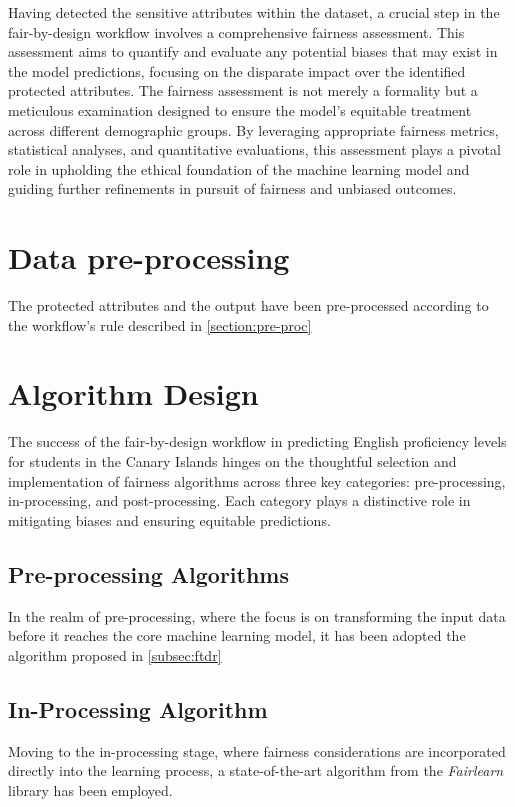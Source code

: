 \documentclass[12pt,a4paper,openright,twoside]{book}
\begin{document}
Having detected the sensitive attributes within the dataset, a crucial step in the fair-by-design workflow involves a comprehensive fairness assessment. This assessment aims to quantify and evaluate any potential biases that may exist in the model predictions, focusing on the disparate impact over the identified protected attributes. The fairness assessment is not merely a formality but a meticulous examination designed to ensure the model's equitable treatment across different demographic groups. By leveraging appropriate fairness metrics, statistical analyses, and quantitative evaluations, this assessment plays a pivotal role in upholding the ethical foundation of the machine learning model and guiding further refinements in pursuit of fairness and unbiased outcomes.

\section{Data pre-processing}

The protected attributes and the output have been pre-processed according to the workflow's rule described in \cref{section:pre-proc}

\section{Algorithm Design}

The success of the fair-by-design workflow in predicting English proficiency levels for students in the Canary Islands hinges on the thoughtful selection and implementation of fairness algorithms across three key categories: pre-processing, in-processing, and post-processing. Each category plays a distinctive role in mitigating biases and ensuring equitable predictions.

\subsection{Pre-processing Algorithms}

In the realm of pre-processing, where the focus is on transforming the input data before it reaches the core machine learning model, it has been adopted the algorithm proposed in \cref{subsec:ftdr}

\subsection{In-Processing Algorithm}

Moving to the in-processing stage, where fairness considerations are incorporated directly into the learning process, a state-of-the-art algorithm from the \emph{Fairlearn} library has been employed.
\end{document}
